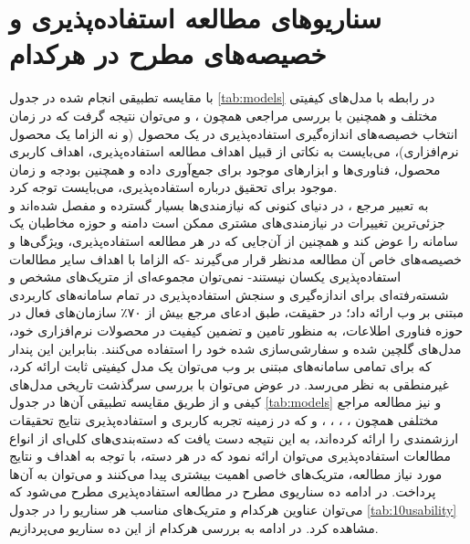 \section{سناریوهای مطالعه استفاده‌پذیری و خصیصه‌های مطرح در هرکدام}
با مقایسه تطبیقی انجام شده در جدول
\ref{tab:models}
در رابطه با مدل‌های کیفیتی مختلف و همچنین با بررسی مراجعی همچون
\cite{wagner_software_2012}،
\cite{wagner_software_2013} و
\cite{albert_measuring_2013}
می‌توان نتیجه گرفت که در زمان انتخاب خصیصه‌های اندازه‌گیری استفاده‌پذیری در یک محصول (و نه الزاما یک محصول نرم‌افزاری)، می‌بایست به نکاتی از قبیل اهداف مطالعه استفاده‌پذیری، اهداف کاربری محصول، فناوری‌ها و ابزارهای موجود برای جمع‌آوری داده و همچنین بودجه و زمان موجود برای تحقیق درباره استفاده‌پذیری، می‌بایست توجه کرد.\\
به تعبیر مرجع
\cite{albert_measuring_2013}،
در دنیای کنونی که نیازمندی‌ها بسیار گسترده و مفصل شده‌اند و جزئی‌ترین تغییرات در نیازمندی‌های مشتری ممکن است دامنه و حوزه مخاطبان یک سامانه را عوض کند و همچنین از آن‌جایی که در هر مطالعه استفاده‌پذیری، ویژگی‌ها و خصیصه‌های خاص آن مطالعه مدنظر قرار می‌گیرند -که الزاما با اهداف سایر مطالعات استفاده‌پذیری یکسان نیستند- نمی‌توان مجموعه‌ای از متریک‌های مشخص و شسته‌رفته‌ای برای اندازه‌گیری و سنجش استفاده‌پذیری در تمام سامانه‌های کاربردی مبتنی بر وب ارائه داد؛‌
در حقیقت، طبق ادعای مرجع
\cite{wagner_software_2012}
بیش از ۷۰٪ سازمان‌های فعال در حوزه فناوری اطلاعات، به منظور تامین و تضمین کیفیت در محصولات نرم‌افزاری خود، مدل‌های گلچین شده و سفارشی‌سازی شده خود را استفاده می‌کنند. بنابراین این پندار که برای تمامی سامانه‌های مبتنی بر وب می‌توان یک مدل کیفیتی ثابت ارائه کرد، غیرمنطقی به نظر می‌رسد. در عوض می‌توان با بررسی سرگذشت تاریخی مدل‌های کیفی و از طریق مقایسه تطبیقی آن‌ها در جدول
\ref{tab:models}
و نیز مطالعه مراجع مختلفی همچون
\cite{alonso-rios_usability:_2009}،
\cite{bass_linking_2003}،
\cite{bevan_what_1991}،
\cite{pressman_software_2015}،
\cite{sommerville_software_2016}
و
\cite{albert_measuring_2013}
که در زمینه تجربه کاربری و استفاده‌پذیری نتایج تحقیقات ارزشمندی را ارائه کرده‌اند، به این نتیجه دست یافت که دسته‌بندی‌های کلی‌ای از انواع مطالعات استفاده‌پذیری می‌توان ارائه نمود که در هر دسته، با توجه به اهداف و نتایج مورد نیاز مطالعه، متریک‌های خاصی اهمیت بیشتری پیدا می‌کنند و می‌توان به آن‌ها پرداخت. در ادامه ده سناریوی مطرح در مطالعه استفاده‌پذیری مطرح می‌شود که می‌توان عناوین هرکدام و متریک‌های مناسب هر سناریو را در جدول
\ref{tab:10usability}
مشاهده کرد. در ادامه به بررسی هرکدام از این ده سناریو می‌پردازیم.
